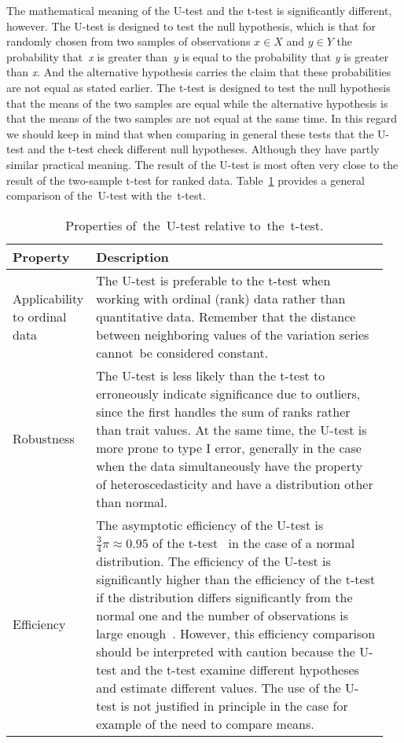 \documentclass[]{scrreprt}
\begin{document}
The mathematical meaning of the U-test and the t-test is significantly different, however. The U-test is designed to test the null hypothesis, which is that for randomly chosen from two samples of observations $x \in X$ and $y \in Y$ the probability that~\textit{x} is greater than~\textit{y} is equal to the probability that \textit{y} is greater than \textit{x}. And the alternative hypothesis carries the claim that these probabilities are not equal as stated earlier. The t-test is designed to test the null hypothesis that the means of the two samples are equal while the alternative hypothesis is that the means of the two samples are not equal at the same time. In this regard we should keep in mind that when comparing in general these tests that the U-test and the t-test check different null hypotheses. Although they have partly similar practical meaning. The result of the U-test is most often very close to the result of the two-sample t-test for ranked data. Table~\ref{tab:U-test-t-test-comparison} provides a general comparison of the~U-test with the~t-test.
%
\begin{table}[htp]
	\caption{Properties of~the~U-test relative to~the~t-test.}  \label{tab:U-test-t-test-comparison}
	\centering
	\begin{tabularx}{\textwidth}{p{0.15\linewidth} p{0.8\linewidth}} 
		\hline
		Property&Description\\
		\hline
		Applicability to ordinal data&The U-test is preferable to the t-test when working with ordinal (rank) data rather than quantitative data. Remember that the distance between neighboring values of the variation series cannot~be considered constant.\\
		\hline
		Robustness&The U-test is less likely than the t-test to erroneously indicate significance due to outliers, since the first handles the sum of ranks rather than trait values. At the same time, the U-test is more prone to type I error, generally in the case when the data simultaneously have the property of heteroscedasticity and have a distribution other than normal.\\
		\hline
		Efficiency&The asymptotic efficiency of the U-test is~$\frac{3}{4}\pi \approx 0.95$ of the t-test~\cite{U-test-efficiency} in the case of a normal distribution. The efficiency of the U-test is significantly higher than the efficiency of the t-test if the distribution differs significantly from the normal one and the number of observations is large enough~\cite{Practical-Nonparametric-Statistics}. However, this efficiency comparison should be interpreted with caution because the U-test and the t-test examine different hypotheses and estimate different values. The use of the U-test is not justified in principle in the case for example of the need to compare means.\\
		\hline
	\end{tabularx}
\end{table}
%
\end{document}
